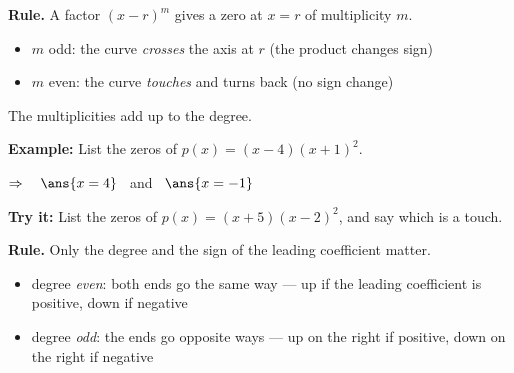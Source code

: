 \documentclass[12pt]{article}
\begin{document}


\begin{formulabox}
\textbf{Rule.} A factor $(x - r)^{m}$ gives a zero at $x = r$ of multiplicity $m$.
\begin{itemize}[leftmargin=0.9cm, itemsep=0pt, topsep=2pt]
  \item $m$ odd: the curve \emph{crosses} the axis at $r$ (the product changes sign)
  \item $m$ even: the curve \emph{touches} and turns back (no sign change)
\end{itemize}
The multiplicities add up to the degree.
\end{formulabox}

\begin{examplebox}
\textbf{Example:} \quad List the zeros of $p(x) = (x - 4)(x + 1)^{2}$.

$\Rightarrow\quad \ans{x = 4}$ \ and \ $\ans{x = -1}$
\end{examplebox}

\begin{tryitbox}
\textbf{Try it:} \quad List the zeros of $p(x) = (x + 5)(x - 2)^{2}$, and say which is a touch.\\[2pt]
\end{tryitbox}


\begin{formulabox}
\textbf{Rule.} Only the degree and the sign of the leading coefficient matter.
\begin{itemize}[leftmargin=0.9cm, itemsep=0pt, topsep=2pt]
  \item degree \emph{even}: both ends go the same way --- up if the leading coefficient is positive, down if negative
  \item degree \emph{odd}: the ends go opposite ways --- up on the right if positive, down on the right if negative
\end{itemize}
\end{formulabox}
\end{document}
